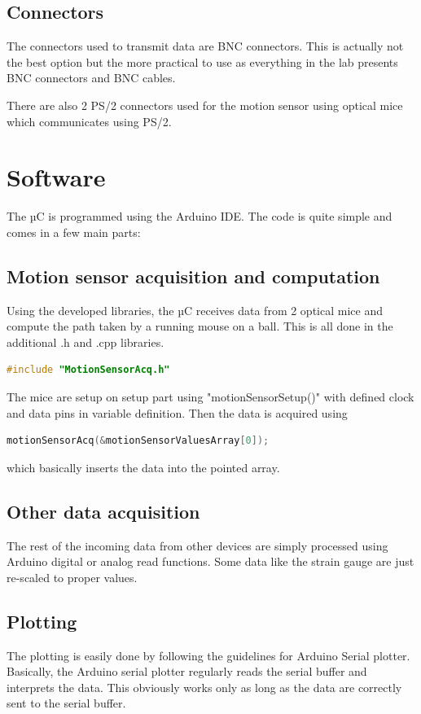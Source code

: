 \documentclass[a4paper]{article}
\begin{document}
\subsection{Connectors}
The connectors used to transmit data are BNC connectors. This is actually not the best option but the more practical to use as everything in the lab presents BNC connectors and BNC cables.

There are also 2 PS/2 connectors used for the motion sensor using optical mice which communicates using PS/2.

\newpage
\section{Software}
The µC is programmed using the Arduino IDE.
The code is quite simple and comes in a few main parts:
\subsection{Motion sensor acquisition and computation}
Using the developed libraries, the µC receives data from 2 optical mice and compute the path taken by a running mouse on a ball.
This is all done in the additional .h and .cpp libraries.
\begin{lstlisting}[language=C++]
#include "MotionSensorAcq.h"
\end{lstlisting}

The mice are setup on setup part using "motionSensorSetup()" with defined clock and data pins in variable definition. Then the data is acquired using
\begin{lstlisting}[language=C++]
motionSensorAcq(&motionSensorValuesArray[0]);
\end{lstlisting}
which basically inserts the data into the pointed array.

\subsection{Other data acquisition}
The rest of the incoming data from other devices are simply processed using Arduino digital or analog read functions. Some data like the strain gauge are just re-scaled to proper values.

\subsection{Plotting}
The plotting is easily done by following the guidelines for Arduino Serial plotter. Basically, the Arduino serial plotter regularly reads the serial buffer and interprets the data. This obviously works only as long as the data are correctly sent to the serial buffer. 
\end{document}
